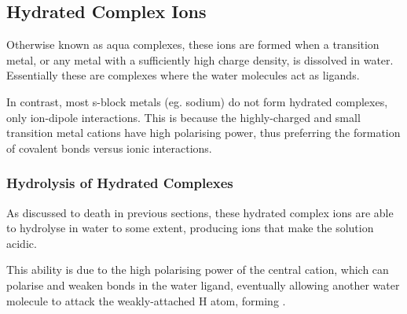 


		\subsection{Hydrated Complex Ions}

			Otherwise known as aqua complexes, these ions are formed when a transition metal, or any metal with a sufficiently high charge
			density, is dissolved in water. Essentially these are complexes where the water molecules act as ligands.

			In contrast, most s-block metals (eg. sodium) do not form hydrated complexes, only ion-dipole interactions. This is because
			the highly-charged and small transition metal cations have high polarising power, thus preferring the formation of
			covalent bonds versus ionic interactions.


			\pagebreak
			\subsubsection{Hydrolysis of Hydrated Complexes}

				As discussed to death in previous sections, these hydrated complex ions are able to hydrolyse in water to some extent, producing
				 ions that make the solution acidic.

				This ability is due to the high polarising power of the central cation, which can polarise and weaken  bonds in the
				water ligand, eventually allowing another water molecule to attack the weakly-attached H atom, forming .




